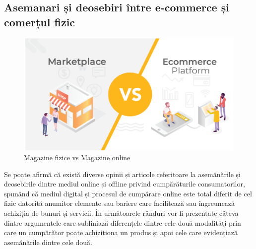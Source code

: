 \documentclass[a4paper, 12pt]{article}
\begin{document}
	\subsection{Asemanari și deosebiri între e-commerce și comerțul fizic}
	\begin{figure}[!htb]
		\centering
		\includegraphics[width=13cm, height=6cm]{"figures/magazin.png"}
		\caption{Magazine fizice vs Magazine online}
	\end{figure}
	
	\quad Se poate afirmă că există diverse opinii și articole referitoare la asemănările și deosebirile dintre mediul online și offline privind cumpărăturile consumatorilor, spunând că mediul digital și procesul de cumpărare online este total diferit de cel fizic datorită anumitor elemente sau bariere care facilitează sau îngreunează achiziția de bunuri și servicii. În următoarele rânduri vor fi prezentate câteva dintre argumentele care subliniază diferențele dintre cele două modalități prin care un cumpărător poate achiziționa un produs și apoi cele care evidențiază asemănările dintre cele două.
	\bigskip
	
\end{document}
